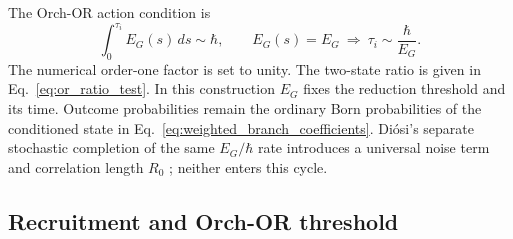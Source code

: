 The Orch-OR action condition is \citep{penrose1996,hameroff2014}
\begin{equation}
  \int_0^{\tau_i}E_G(s)\,ds\sim\hbar,
  \qquad
  E_G(s)=E_G\ \Longrightarrow\
  \tau_i\sim\frac{\hbar}{E_G}.
  \label{eq:or_time}
\end{equation}
\noindent The numerical order-one factor is set to unity. The two-state ratio is
given in Eq.~\eqref{eq:or_ratio_test}. In this construction $E_G$ fixes the reduction
threshold and its time. Outcome probabilities remain the ordinary Born probabilities
of the conditioned state in Eq.~\eqref{eq:weighted_branch_coefficients}. Diósi's
separate stochastic completion of the same $E_G/\hbar$ rate introduces a universal
noise term and correlation length $R_0$ \citep{diosi2022}; neither enters this cycle.

\subsection{Recruitment and Orch-OR threshold}

